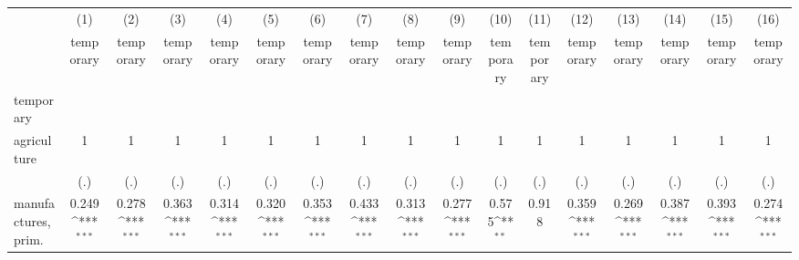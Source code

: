 {
\def\sym#1{\ifmmode^{#1}\else\(^{#1}\)\fi}
\begin{tabular}{l*{16}{c}}
\hline\hline
                    &\multicolumn{1}{c}{(1)}&\multicolumn{1}{c}{(2)}&\multicolumn{1}{c}{(3)}&\multicolumn{1}{c}{(4)}&\multicolumn{1}{c}{(5)}&\multicolumn{1}{c}{(6)}&\multicolumn{1}{c}{(7)}&\multicolumn{1}{c}{(8)}&\multicolumn{1}{c}{(9)}&\multicolumn{1}{c}{(10)}&\multicolumn{1}{c}{(11)}&\multicolumn{1}{c}{(12)}&\multicolumn{1}{c}{(13)}&\multicolumn{1}{c}{(14)}&\multicolumn{1}{c}{(15)}&\multicolumn{1}{c}{(16)}\\
                    &\multicolumn{1}{c}{temporary}&\multicolumn{1}{c}{temporary}&\multicolumn{1}{c}{temporary}&\multicolumn{1}{c}{temporary}&\multicolumn{1}{c}{temporary}&\multicolumn{1}{c}{temporary}&\multicolumn{1}{c}{temporary}&\multicolumn{1}{c}{temporary}&\multicolumn{1}{c}{temporary}&\multicolumn{1}{c}{temporary}&\multicolumn{1}{c}{temporary}&\multicolumn{1}{c}{temporary}&\multicolumn{1}{c}{temporary}&\multicolumn{1}{c}{temporary}&\multicolumn{1}{c}{temporary}&\multicolumn{1}{c}{temporary}\\
\hline
temporary           &                     &                     &                     &                     &                     &                     &                     &                     &                     &                     &                     &                     &                     &                     &                     &                     \\
agriculture         &           1         &           1         &           1         &           1         &           1         &           1         &           1         &           1         &           1         &           1         &           1         &           1         &           1         &           1         &           1         &           1         \\
                    &         (.)         &         (.)         &         (.)         &         (.)         &         (.)         &         (.)         &         (.)         &         (.)         &         (.)         &         (.)         &         (.)         &         (.)         &         (.)         &         (.)         &         (.)         &         (.)         \\
[1em]
manufactures, prim. &       0.249\sym{***}&       0.278\sym{***}&       0.363\sym{***}&       0.314\sym{***}&       0.320\sym{***}&       0.353\sym{***}&       0.433\sym{***}&       0.313\sym{***}&       0.277\sym{***}&       0.575\sym{**} &       0.918         &       0.359\sym{***}&       0.269\sym{***}&       0.387\sym{***}&       0.393\sym{***}&       0.274\sym{***}\\

\end{tabular}}
